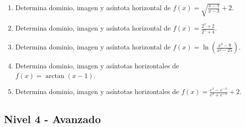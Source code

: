 \documentclass[11pt,a4paper]{article}
\begin{document}
\begin{enumerate}[label=\textbf{E\arabic*.},start=41]
\item Determina dominio, imagen y asíntota horizontal de $f(x)=\sqrt{\frac{x-1}{x-3}}+2$.

\item Determina dominio, imagen y asíntota horizontal de $f(x)=\frac{2^x+2}{2^x+4}$. 

\item Determina dominio, imagen y asíntota horizontal de $f(x)=\ln\left(\frac{x^2-9}{x^2-25}\right)$.

\item Determina dominio, imagen y asíntotas horizontales de $f(x)=\arctan(x-1)$.

\item Determina dominio, imagen y asíntotas horizontales de $f(x)=\frac{e^x-e^{-x}}{e^x+e^{-x}}+2$.

\end{enumerate}

\subsection{Nivel 4 - Avanzado}
\end{document}
